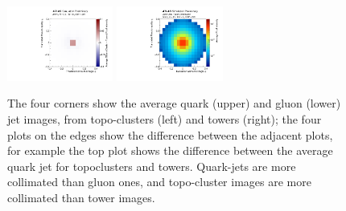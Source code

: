 \begin{figure}[h!]
\begin{center}
\includegraphics[width=0.31\textwidth]{figures/CNN/diff_gluon_cluster_tower.pdf}
\includegraphics[width=0.31\textwidth]{figures/CNN/gluon_tower.pdf}
\caption{The four corners show the average quark (upper) and gluon (lower) jet images, from topo-clusters (left) and towers (right); the four plots on the edges show the difference between the adjacent plots, for example the top plot shows the difference between the average quark jet for topoclusters and towers. Quark-jets are more collimated than gluon ones, and topo-cluster images are more collimated than tower images.}
\label{fig:cnn-avg:clustertower}
\end{center}
\end{figure}

\clearpage

